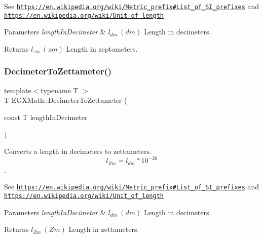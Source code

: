 See \href{https://en.wikipedia.org/wiki/Metric_prefix#List_of_SI_prefixes}{\tt https\+://en.\+wikipedia.\+org/wiki/\+Metric\+\_\+prefix\#\+List\+\_\+of\+\_\+\+S\+I\+\_\+prefixes} and \href{https://en.wikipedia.org/wiki/Unit_of_length}{\tt https\+://en.\+wikipedia.\+org/wiki/\+Unit\+\_\+of\+\_\+length} 
\begin{DoxyParams}{Parameters}
{\em length\+In\+Decimeter} & $ l_{dm}\ (dm)$ Length in decimeters. \\
\hline
\end{DoxyParams}
\begin{DoxyReturn}{Returns}
$ l_{zm}\ (zm)$ Length in zeptometers. 
\end{DoxyReturn}
\mbox{\label{group___e_g_x_math-_conversions-_length_conversions-_s_i-_decimeter-_s_i_ga11b07d4dcd18209ab0b2cb3b2f0bdb59}} 
\subsubsection{\texorpdfstring{Decimeter\+To\+Zettameter()}{DecimeterToZettameter()}}
{\footnotesize\ttfamily template$<$typename T $>$ \\
T E\+G\+X\+Math\+::\+Decimeter\+To\+Zettameter (\begin{DoxyParamCaption}\item[{const T}]{length\+In\+Decimeter }\end{DoxyParamCaption})}



Converts a length in decimeters to zettameters. \[ l_{Zm}=l_{dm} * 10^{-26} \]. 

See \href{https://en.wikipedia.org/wiki/Metric_prefix#List_of_SI_prefixes}{\tt https\+://en.\+wikipedia.\+org/wiki/\+Metric\+\_\+prefix\#\+List\+\_\+of\+\_\+\+S\+I\+\_\+prefixes} and \href{https://en.wikipedia.org/wiki/Unit_of_length}{\tt https\+://en.\+wikipedia.\+org/wiki/\+Unit\+\_\+of\+\_\+length} 
\begin{DoxyParams}{Parameters}
{\em length\+In\+Decimeter} & $ l_{dm}\ (dm)$ Length in decimeters. \\
\hline
\end{DoxyParams}
\begin{DoxyReturn}{Returns}
$ l_{Zm}\ (Zm)$ Length in zettameters. 
\end{DoxyReturn}
